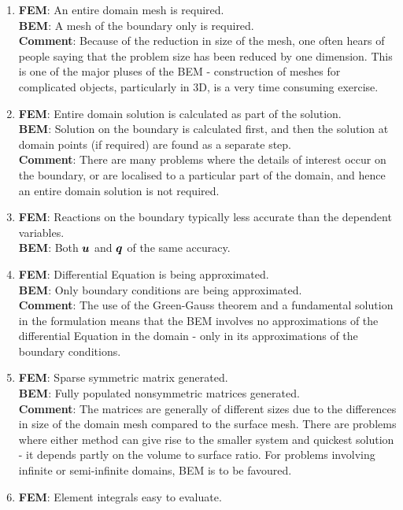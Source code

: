 \begin{enumerate}
\item \textbf{FEM}: An entire domain mesh is required. \\ 
  \textbf{BEM}: A mesh of the boundary only is required. \\ 
  \textbf{Comment}: Because of the reduction in size of the mesh, one 
  often hears of people saying that the problem size has been reduced by one
  dimension.  This is one of the major pluses of the BEM - construction of
  meshes for complicated objects, particularly in 3D, is a very time consuming
  exercise. 
\item \textbf{FEM}: Entire domain solution is calculated as part of the 
  solution. \\
  \textbf{BEM}: Solution on the boundary is calculated first, and then the 
  solution at domain points (if required) are found as a separate step. \\ 
  \textbf{Comment}: There are many problems where the details of interest occur 
  on the boundary, or are localised to a particular part of the domain, and 
  hence an entire domain solution is not required.
\item \textbf{FEM}: Reactions on the boundary typically less accurate than the 
  dependent variables. \\
  \textbf{BEM}: Both $\vect{u}$ and $\vect{q}$ of the same accuracy.
\item \textbf{FEM}: Differential Equation is being approximated. \\
  \textbf{BEM}: Only boundary conditions are being approximated. \\ 
  \textbf{Comment}: The use of the Green-Gauss theorem and a fundamental 
  solution in the formulation means that the BEM involves no approximations 
  of the differential Equation in the domain - only in its approximations 
  of the boundary conditions.
\item \textbf{FEM}: Sparse symmetric matrix generated. \\
  \textbf{BEM}: Fully populated nonsymmetric matrices generated. \\
  \textbf{Comment}: The matrices are generally of different sizes due to the 
  differences in size of the domain mesh compared to the surface mesh.  There 
  are problems where either method can give rise to the smaller system and 
  quickest solution - it depends partly on the volume to surface ratio.  
  For problems involving infinite or semi-infinite domains, BEM is to be 
  favoured.
\item \textbf{FEM}: Element integrals easy to evaluate. \\

\end{enumerate}
